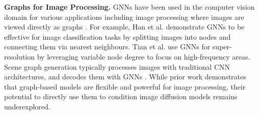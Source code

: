 \textbf{Graphs for Image Processing.} GNNs have been used in the computer vision domain for various applications including image processing where images are viewed directly as graphs \cite{tarasiewicz_graph_2021, han_vision_2022, tian_image_nodate, krzywda_graph_2022, defferrard_convolutional_2017, liu_cnn-enhanced_2021, wan_multi-scale_2019}. For example, Han et al. \cite{han_vision_2022} demonstrate GNNs to be effective for image classification tasks by splitting images into nodes and connecting them via nearest neighbours. Tian et al. \cite{tian_image_nodate} use GNNs for super-resolution by leveraging variable node degree to focus on high-frequency areas. Scene graph generation typically processes images with traditional CNN architectures, and decodes them with GNNs \cite{xu_scene_2017, yang_graph_2018}. While prior work demonstrates that graph-based models are flexible and powerful for image processing, their potential to directly use them to condition image diffusion models remains underexplored.

